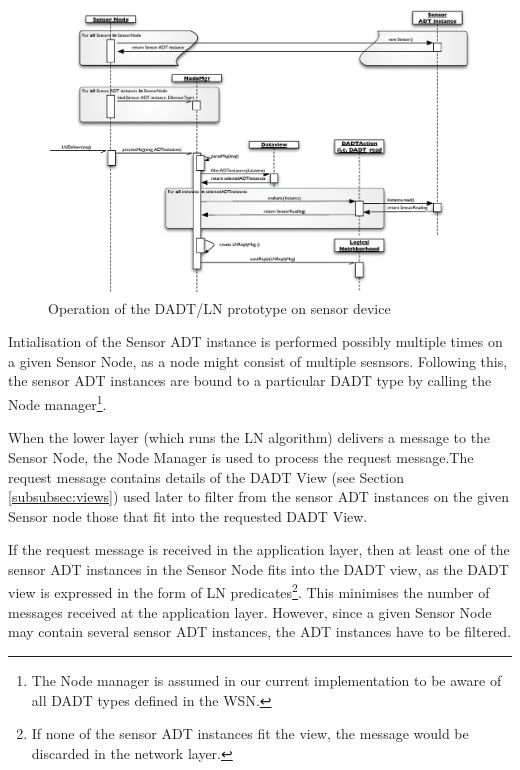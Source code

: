 \begin{figure}
\centering
\includegraphics[width=\textwidth]{img/SeqDiagram_Sensornode.eps}
\caption[Operation of the DADT/LN prototype on sensor device]{Operation of the DADT/LN prototype on sensor device}
\label{Fig:SeqDiagram_Sensornode}
\end{figure}

Intialisation of the Sensor ADT instance is performed possibly
multiple times on a given Sensor Node, as a node might consist of multiple sesnsors. Following
this, the sensor ADT instances are bound to a particular DADT type by calling
the Node manager\footnote{The Node manager is assumed in our
current implementation to be aware of all DADT types defined in the WSN.}.

When the lower layer (which runs the LN algorithm) delivers a message to the
Sensor Node, the Node Manager is used to process the request message.The
request message contains details of the DADT View (see Section
\ref{subsubsec:views}) used later to filter from the sensor ADT
instances on the given Sensor node those that fit into the requested DADT View. 

If the request message is received in the application layer, then at least one of
the sensor ADT instances in the Sensor Node fits into the DADT view, as the DADT
view is expressed in the form of LN predicates\footnote{If none of the sensor ADT instances fit the view, the message would be discarded in the network layer.}. This minimises the number of
messages received at the application layer. However, since a given Sensor Node
may contain several sensor ADT instances, the ADT instances have to be filtered.

